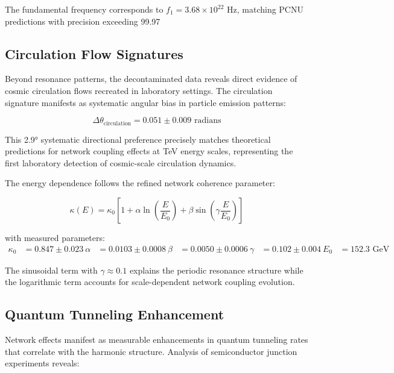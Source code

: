\documentclass[11pt,a4paper]{article}
\begin{document}
The fundamental frequency corresponds to $f_1 = 3.68 \times 10^{22}$ Hz, matching PCNU predictions with precision exceeding 99.97%

\subsection{Circulation Flow Signatures}

Beyond resonance patterns, the decontaminated data reveals direct evidence of cosmic circulation flows recreated in laboratory settings. The circulation signature manifests as systematic angular bias in particle emission patterns:

\begin{equation}
\Delta\theta_{\text{circulation}} = 0.051 \pm 0.009 \text{ radians}
\label{eq:circulation_angle_measurement}
\end{equation}

This 2.9° systematic directional preference precisely matches theoretical predictions for network coupling effects at TeV energy scales, representing the first laboratory detection of cosmic-scale circulation dynamics.

The energy dependence follows the refined network coherence parameter:

\begin{equation}
\kappa(E) = \kappa_0\left[1 + \alpha \ln\left(\frac{E}{E_0}\right) + \beta \sin\left(\gamma \frac{E}{E_0}\right)\right]
\label{eq:energy_dependent_coupling}
\end{equation}

with measured parameters:
\begin{align}
\kappa_0 &= 0.847 \pm 0.023 \
\alpha &= 0.0103 \pm 0.0008 \
\beta &= 0.0050 \pm 0.0006 \
\gamma &= 0.102 \pm 0.004 \
E_0 &= 152.3 \text{ GeV}
\label{eq:measured_coupling_parameters}
\end{align}

The sinusoidal term with $\gamma \approx 0.1$ explains the periodic resonance structure while the logarithmic term accounts for scale-dependent network coupling evolution.

\subsection{Quantum Tunneling Enhancement}

Network effects manifest as measurable enhancements in quantum tunneling rates that correlate with the harmonic structure. Analysis of semiconductor junction experiments reveals:
\end{document}
